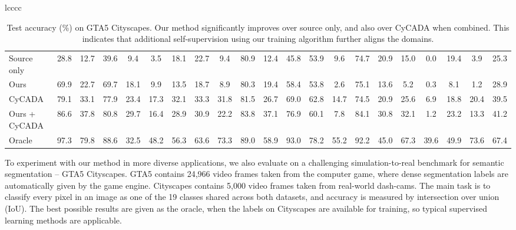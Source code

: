 \documentclass{article} \usepackage{iclr2020_conference,times}
\begin{document}
\begin{wraptable}{r}{0.45\textwidth}
\begin{tabular}{lcccc}
\begin{table*}
\begin{center}
\begin{tabular}{lcccccccccccccccccccc}
    Source only                 & 28.8 &     12.7 &     39.6 &      9.4 &      3.5 &     18.1 &     22.7 &  9.4 &     80.9 &     12.4 &     45.8 &     53.9 &  9.6 &     74.7 &     20.9 &     15.0 &     0.0 &     19.4 &  3.9 &     25.3 \\
	Ours                        &     69.9 &     22.7 &     69.7 &     18.1 &      9.9 &     13.5 &     18.7 &  8.9 &     80.3 &     19.4 &     58.4 &     53.8 &  2.6 &     75.1 &     13.6 &      5.2 &     0.3 &      8.1 &  1.2   &   28.9 \\
    \midrule
    CyCADA    &     79.1 &     33.1 &     77.9 &     23.4 &     17.3 &     32.1 &     33.3 & 31.8 &     81.5 &     26.7 &     69.0 &     62.8 & 14.7 &     74.5 &     20.9 &     25.6 &     6.9 &     18.8 & 20.4 &     39.5 \\
    Ours + CyCADA               &     86.6 &     37.8 &     80.8 &     29.7 &     16.4 &     28.9 &     30.9 & 22.2 &     83.8 &     37.1 &     76.9 &     60.1 &  7.8 &     84.1 &     30.8 &     32.1 &     1.2 &     23.2 & 13.3 &     41.2 \\
    \midrule
    Oracle                      &     97.3 &     79.8 &     88.6 &     32.5 &     48.2 &     56.3 &     63.6 & 73.3 &     89.0 &     58.9 &     93.0 &     78.2 & 55.2 &     92.2 &     45.0 &     67.3 &    39.6 &     49.9 & 73.6 &     67.4 \\
    \bottomrule
  \end{tabular}
  \caption{
    Test accuracy (\%) on GTA5  Cityscapes.
    Our method significantly improves over source only, and also over CyCADA when combined. This indicates that additional self-supervision using our training algorithm further aligns the domains.
  }
  \label{table:gta-cityscapes}
  \vspace{-3ex}
  \end{center}
\end{table*}

To experiment with our method in more diverse applications, we also evaluate on a challenging simulation-to-real benchmark for semantic segmentation -- GTA5  Cityscapes. 
GTA5 \citep{richter2016playing} contains 24,966 video frames taken from the computer game, where dense segmentation labels are automatically given by the game engine.
Cityscapes \citep{cordts_cityscapes} contains 5,000 video frames taken from real-world dash-cams.
The main task is to classify every pixel in an image as one of the 19 classes shared across both datasets, and accuracy is measured by intersection over union (IoU).
The best possible results are given as the oracle, when the labels on Cityscapes are available for training, so typical supervised learning methods are applicable.


\end{tabular}
\end{wraptable}
\end{document}
